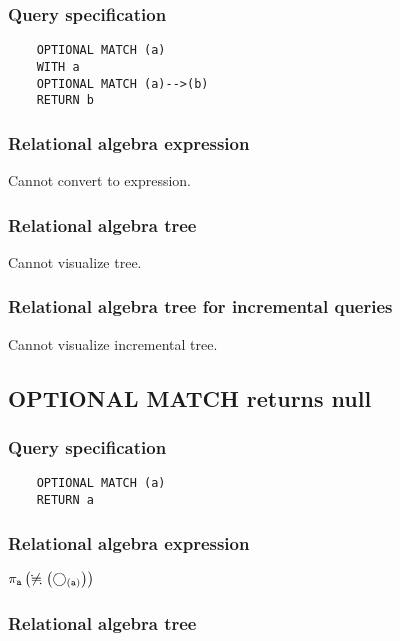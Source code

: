 	\subsubsection*{Query specification}

	\begin{lstlisting}
	OPTIONAL MATCH (a)
	WITH a
	OPTIONAL MATCH (a)-->(b)
	RETURN b
	\end{lstlisting}


	\subsubsection*{Relational algebra expression}

	Cannot convert to expression.

	\subsubsection*{Relational algebra tree}

	Cannot visualize tree.

	\subsubsection*{Relational algebra tree for incremental queries}

	Cannot visualize incremental tree.
	\subsection{OPTIONAL MATCH returns null}

	\subsubsection*{Query specification}

	\begin{lstlisting}
	OPTIONAL MATCH (a)
	RETURN a
	\end{lstlisting}


	\subsubsection*{Relational algebra expression}

	$\projection{\var{a}} \left(\alldifferent{} \left(\getvertices{a}{}\right)\right)$

	\subsubsection*{Relational algebra tree}

